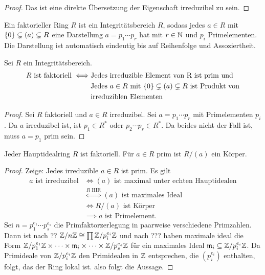 \begin{proof}
    Das ist eine direkte Übersetzung der Eigenschaft irreduzibel zu sein.
\end{proof}
\begin{Def}
    Ein faktorieller Ring $R$ ist ein Integritätsbereich $R$, sodass jedes $a\in R$ mit $\{0\}\subsetneq (a)\subsetneq R$ eine Darstellung $a=p_1\cdots p_r$ hat mit $r\in\mathbb{N}$ und $p_i$ Primelementen. Die Darstellung ist automatisch eindeutig bis auf Reihenfolge und Assoziertheit.
\end{Def}
\begin{Lemma}
    Sei $R$ ein Integritätsbereich. 
    \begin{align*}
        R \text{ ist faktoriell} \iff& \text{Jedes irreduzible Element von R ist prim und}\\
        & \text{Jedes $a\in R$ mit $\{0\}\subsetneq (a)\subsetneq R$ ist Produkt von}\\
        &\text{irreduziblen Elementen}
    \end{align*}
\end{Lemma}
\begin{proof}
    Sei $R$ faktoriell und $a\in R$ irreduzibel. Sei $a=p_1\cdots p_r$ mit Primelementen $p_i$. Da $a$ irreduzibel ist, ist $p_1\in R^*$ oder $p_2\cdots p_r\in R^*$. Da beides nicht der Fall ist, muss $a=p_1$ prim sein.
\end{proof}
\begin{Satz}
    Jeder Hauptidealring $R$ ist faktoriell. Für $a\in R$ prim ist $R/(a)$ ein Körper.
\end{Satz}
\begin{proof}
    Zeige: Jedes irreduzible $a\in R$ ist prim. Es gilt 
    \begin{align*}
        a \text{ ist irreduzibel} &\iff (a) \text{ ist maximal unter echten Hauptidealen}\\
        &\stackrel{R \text{ HIR}}\iff (a) \text{ ist maximales Ideal}\\
        &\iff R/(a) \text{ ist Körper}\\
        &\implies a \text{ ist Primelement.}
    \end{align*}
    Sei $n=p_1^{e_1}\cdots p_s^{e_s}$ die Primfaktorzerlegung in paarweise verschiedene Primzahlen. Dann ist nach ?? $\mathbb{Z}/n\mathbb{Z}\cong \prod \mathbb{Z}/p_i^{e_i}\mathbb{Z}$ und nach ??? haben maximale ideal die Form $\mathbb{Z}/p_1^{e_1}\mathbb{Z}\times\dots\times \mathfrak{m}_i\times\dots\times \mathbb{Z}/p_s^{e_s}\mathbb{Z}$ für ein maximales Ideal $\mathfrak{m}_i \subseteq \mathbb{Z}/p_i^{e_i}\mathbb{Z}$.
    Da Primideale von $\mathbb{Z}/p_i^{e_i}\mathbb{Z}$ den Primidealen in $\mathbb{Z}$ entsprechen, die $(p_i^{e_i})$ enthalten, folgt, das der Ring lokal ist. also folgt die Aussage.
\end{proof}


